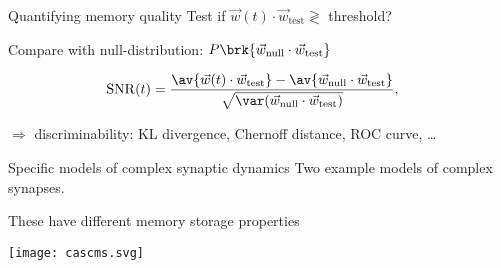 \documentclass[final]{beamer}%
\DeclareMathOperator{\snr}{SNR}
\newcommand{\snrb}{\overline{\snr}}
\newcommand{\syn}{\vec{w}}
\newcommand{\synid}{\syn_\text{ideal}}
\begin{document}

\begin{frame}{Quantifying memory quality}
%
 Test if $\syn(t)\cdot\syn_\text{test}  \gtrless$ threshold?

 \vp Compare with null-distribution: $P\brk{\syn_\text{null}\cdot\syn_\text{test}}$

 \vp
 \begin{equation*}
   \begin{aligned}
     \snr(t) &= \frac{ \av{\syn(t)\cdot\syn_\text{test}} - \av{\syn_\text{null}\cdot\syn_\text{test}} }{ \sqrt{\var(\syn_\text{null}\cdot\syn_\text{test})}},
   \end{aligned}
 \end{equation*}

 \vp $\Rightarrow$ discriminability: KL divergence, Chernoff distance, ROC curve, \ldots
%
\end{frame}


\begin{frame}{Specific models of complex synaptic dynamics}
%
 Two example models of complex synapses.
 \begin{center}
  \hspace{2cm}
 \end{center}

 These have different memory storage properties
 \begin{center}
   \texttt{[image: cascms.svg]}
 \end{center}
%
\end{frame}

\end{document}
